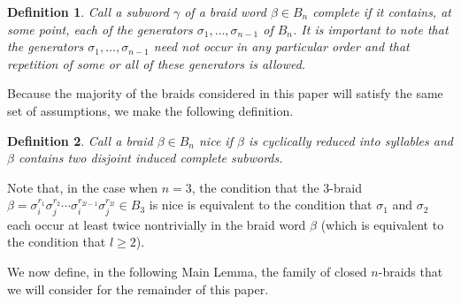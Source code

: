 \documentclass{article}
\newtheorem{definition}{Definition}[section]
\begin{document}
\begin{definition}
Call a subword $\gamma$ of a braid word $\beta \in B_{n}$ \emph{complete} if it contains, at some point, each of the generators $\sigma_{1}, \ldots, \sigma_{n-1}$ of $B_{n}$. It is important to note that the generators $\sigma_{1}, \ldots, \sigma_{n-1}$ need not occur in any particular order and that repetition of some or all of these generators is allowed.
\end{definition}

Because the majority of the braids considered in this paper will satisfy the same set of assumptions, we make the following definition. 

\begin{definition}
Call a braid $\beta \in B_{n}$ \emph{nice} if $\beta$ is cyclically reduced into syllables and $\beta$ contains two disjoint induced complete subwords.
\end{definition}

Note that, in the case when $n=3$, the condition that the 3-braid $\beta=\sigma_{i}^{r_{1}}\sigma_{j}^{r_{2}}\cdots\sigma_{i}^{r_{2l-1}}\sigma_{j}^{r_{2l}} \in B_{3}$ is nice is equivalent to the condition that $\sigma_{1}$ and $\sigma_{2}$ each occur at least twice nontrivially in the braid word $\beta$ (which is equivalent to the condition that $l \geq 2$). 

We now define, in the following Main Lemma, the family of closed $n$-braids that we will consider for the remainder of this paper. 
\end{document}
